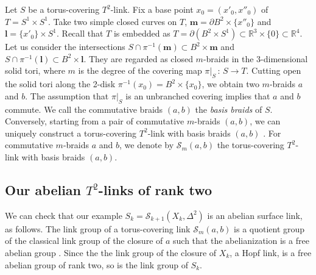 \documentclass[a4paper,11pt]{amsart}
\numberwithin{equation}{section}
\begin{document}
Let $S$ be a torus-covering $T^{2}$-link. Fix a base point $x_0 =(x'_{0},x''_{0})$ of $T = S^{1} \times S^{1}$. Take two simple closed curves on $T$, $\mathbf{m} = \partial B^{2} \times \{x''_0\}$ and $\mathbf{l}= \{x'_{0}\}\times S^{1}$. Recall that $T$ is embedded as $T=\partial (B^{2} \times S^{1}) \subset \mathbb{R}^{3} \times \{0\} \subset \mathbb{R}^{4}$. Let us consider the intersections $S \cap \pi^{-1}(\mathbf{m}) \subset B^2 \times \mathbf{m}$ and $S \cap \pi^{-1}(\mathbf{l}) \subset B^2 \times \mathbf{l}$. They are regarded as closed $m$-braids in the 3-dimensional solid tori, where $m$ is the degree of the covering map $\pi |_{S} \, :\, S  \rightarrow T$. Cutting open the solid tori along the 2-disk $\pi^{-1}(x_0)= B^2 \times \{x_{0}\}$, we obtain two $m$-braids $a$ and $b$.
The assumption that $\pi|_{S}$ is an unbranched covering implies that $a$ and $b$ commute. We call the commutative braids $(a, b)$ the {\it basis braids} of $S$. Conversely, starting from a pair of commutative $m$-braids $(a, b)$, we can uniquely construct a torus-covering $T^2$-link with basis braids $(a, b)$ \cite[Lemma 2.8]{N1}.
For commutative $m$-braids $a$ and $b$, we denote by $\mathcal{S}_{m}(a,b)$ the torus-covering $T^2$-link with basis braids $(a, b)$. 


\subsection{Our abelian $T^2$-links of rank two}\label{sec:5-3}
We can check that our example $S_k=\mathcal{S}_{k+1}(X_k, \Delta^2)$ is an abelian surface link, as follows. 
The link group of a torus-covering link $\mathcal{S}_m(a,b)$ is a quotient group of the classical link group of the closure of $a$  such that the abelianization is a free abelian group \cite[Proposition 3.1]{N1}. Since the the link group of the closure of $X_k$, a Hopf link, is a free abelian group of rank two, so is the link group of $S_k$.
\end{document}
